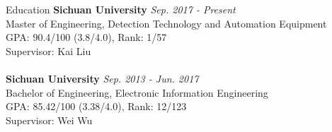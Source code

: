 \documentclass{resume} %
\begin{document}
\begin{rSection}{Education}
	{\bf Sichuan University} \hfill {\em Sep. 2017 - Present} 
	\\ Master of Engineering, Detection Technology and Automation Equipment\\ GPA: 90.4/100 (3.8/4.0), Rank: 1/57\\
	Supervisor: Kai Liu\\
	\\{\bf Sichuan University} \hfill {\em Sep. 2013 - Jun. 2017} 
	\\ Bachelor of Engineering, Electronic Information Engineering\\GPA: 85.42/100 (3.38/4.0), Rank: 12/123\\
	Supervisor: Wei Wu
\end{rSection}
\end{document}
